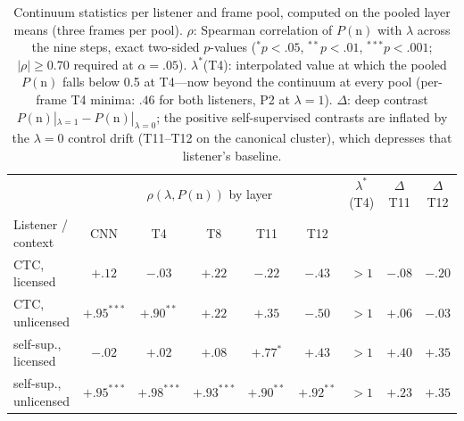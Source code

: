 \documentclass[11pt,a4paper]{article}
\newcommand{\lam}{\lambda}
\begin{document}
\begin{table}[t]
\small
\centering
\begin{tabular}{@{}lccccc ccc@{}}
\toprule
 & \multicolumn{5}{c}{$\rho(\lam, P(\mathrm{n}))$ by layer} &
 $\lam^{*}$(T4) & $\Delta$T11 & $\Delta$T12 \\
\cmidrule(lr){2-6} \cmidrule(lr){7-7} \cmidrule(lr){8-9}
Listener / context & CNN & T4 & T8 & T11 & T12 & & & \\
\midrule
CTC, licensed & $+.12$ & $-.03$ & $+.22$ & $-.22$ &
 $-.43$ & $>1$ & $-.08$ & $-.20$ \\
CTC, unlicensed & $+.95^{***}$ & $+.90^{**}$ & $+.22$ &
 $+.35$ & $-.50$ & $>1$ & $+.06$ & $-.03$ \\
self-sup., licensed & $-.02$ & $+.02$ & $+.08$ &
 $+.77^{*}$ & $+.43$ & $>1$ & $+.40$ & $+.35$ \\
self-sup., unlicensed & $+.95^{***}$ & $+.98^{***}$ & $+.93^{***}$ &
 $+.90^{**}$ & $+.92^{**}$ & $>1$ & $+.23$ & $+.35$ \\
\bottomrule
\end{tabular}
\caption{Continuum statistics per listener and frame pool, computed
on the pooled layer means (three frames per pool). $\rho$:
Spearman correlation of $P(\mathrm{n})$ with $\lam$ across the nine
steps, exact two-sided $p$-values ($^{*}p{<}.05$, $^{**}p{<}.01$,
$^{***}p{<}.001$; $|\rho| \geq 0.70$ required at $\alpha = .05$).
$\lam^{*}$(T4): interpolated value at which the pooled $P(\mathrm{n})$
falls below 0.5 at T4---now beyond the continuum at every pool
(per-frame T4 minima: $.46$ for both listeners, P2 at $\lam=1$). $\Delta$: deep contrast
$P(\mathrm{n})|_{\lam=1} - P(\mathrm{n})|_{\lam=0}$; the positive
self-supervised contrasts are inflated by the $\lam=0$ control drift
(T11--T12 on the canonical cluster), which depresses that listener's
baseline.}
\label{tab:continuum}
\end{table}
\end{document}
